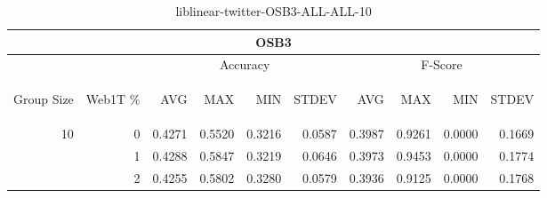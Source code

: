 \begin{center}
\begin{table}[htbp] 
 \begin{center}
\begin{tabular}{ | r | r | r | r | r | r | r | r | r | r |}
\hline
\multicolumn{10}{|c|}{OSB3}\\
\hline
 & & \multicolumn{4}{|c|}{Accuracy} & \multicolumn{4}{|c|}{F-Score}\\ \cline{3-10}
\begin{sideways}Group Size\end{sideways} & \begin{sideways}Web1T \%\end{sideways} & \begin{sideways}AVG\end{sideways} & \begin{sideways}MAX\end{sideways} & \begin{sideways}MIN\end{sideways} & \begin{sideways}STDEV\end{sideways} & \begin{sideways}AVG\end{sideways} & \begin{sideways}MAX\end{sideways} & \begin{sideways}MIN\end{sideways} & \begin{sideways}STDEV\end{sideways}\\
\hline
\multirow{2}{*}{10}
 & 0 & 0.4271 & 0.5520 & 0.3216 & 0.0587 & 0.3987 & 0.9261 & 0.0000 & 0.1669\\ \cline{2-10}
 & 1 & 0.4288 & 0.5847 & 0.3219 & 0.0646 & 0.3973 & 0.9453 & 0.0000 & 0.1774\\ \cline{2-10}
 & 2 & 0.4255 & 0.5802 & 0.3280 & 0.0579 & 0.3936 & 0.9125 & 0.0000 & 0.1768\\ \cline{2-10}
\hline
\end{tabular}
\caption{liblinear-twitter-OSB3-ALL-ALL-10}
\label{table:liblinear-twitter-OSB3-ALL-ALL-10}
\end{center}
 \end{table}
\end{center}

